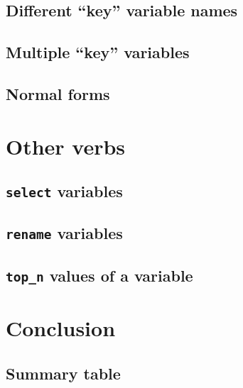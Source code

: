 \documentclass[12pt, krantz2,]{krantz}
\begin{document}
\hypertarget{diff-key}{%
\subsection{Different ``key'' variable names}\label{diff-key}}

\hypertarget{multiple-key-variables}{%
\subsection{Multiple ``key'' variables}\label{multiple-key-variables}}

\hypertarget{normal-forms}{%
\subsection{Normal forms}\label{normal-forms}}

\hypertarget{other-verbs}{%
\section{Other verbs}\label{other-verbs}}

\hypertarget{select}{%
\subsection{\texorpdfstring{\texttt{select} variables}{select variables}}\label{select}}

\hypertarget{rename}{%
\subsection{\texorpdfstring{\texttt{rename} variables}{rename variables}}\label{rename}}

\hypertarget{top_n-values-of-a-variable}{%
\subsection{\texorpdfstring{\texttt{top\_n} values of a variable}{top\_n values of a variable}}\label{top_n-values-of-a-variable}}

\hypertarget{conclusion-2}{%
\section{Conclusion}\label{conclusion-2}}

\hypertarget{summary-table-1}{%
\subsection{Summary table}\label{summary-table-1}}
\end{document}
